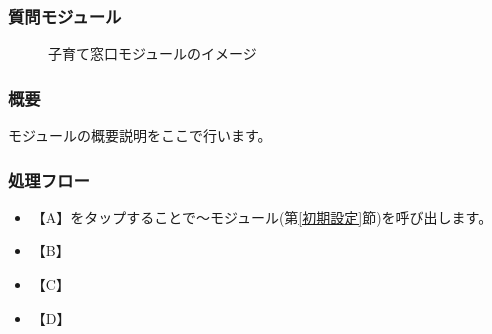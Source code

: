 \documentclass[a4j]{jarticle}
\begin{document}
\subsubsection{質問モジュール\label{質問}} %
\begin{figure}[H]
    \begin{center}
    \caption {子育て窓口モジュールのイメージ}
    \label{functionselection}
    \end{center}
\end{figure}
\subsubsection*{概要}
モジュールの概要説明をここで行います。
\subsubsection*{処理フロー}
\begin{itemize}
\item 【A】をタップすることで～モジュール(第\ref{初期設定}節)を呼び出します。%
\item 【B】
\item 【C】
\item 【D】
\end{itemize}
\end{document}

